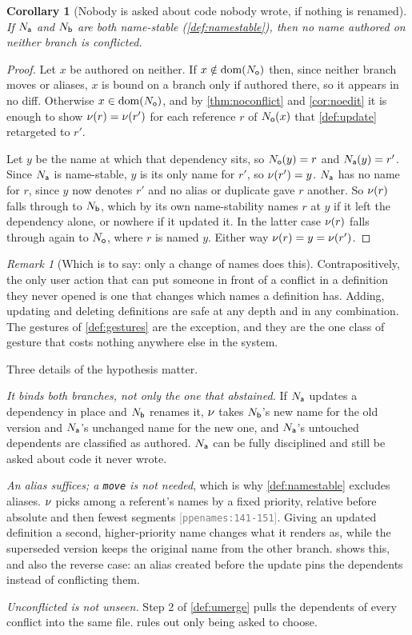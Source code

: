 \documentclass[11pt]{article}
\theoremstyle{definition}
\theoremstyle{plain}
\newtheorem{corollary}{Corollary}[section]
\theoremstyle{remark}
\newtheorem{remark}{Remark}[section]
\newcommand{\src}[1]{{\footnotesize\textcolor{gray}{[\texttt{#1}]}}}
\begin{document}
\begin{corollary}[Nobody is asked about code nobody wrote, if nothing is renamed]\label{cor:noedit-user}
If $N_{\mathsf{a}}$ and $N_{\mathsf{b}}$ are both name-stable (\cref{def:namestable}), then no name authored on neither
branch is conflicted.
\end{corollary}
\begin{proof}
Let $x$ be authored on neither. If $x \notin \operatorname{dom}(N_{\mathsf{o}})$ then, since neither branch moves or aliases,
$x$ is bound on a branch only if authored there, so it appears in no diff. Otherwise $x \in \operatorname{dom}(N_{\mathsf{o}})$,
and by \cref{thm:noconflict} and \cref{cor:noedit} it is enough to show $\nu(r) = \nu(r')$ for
each reference $r$ of $N_{\mathsf{o}}(x)$ that \cref{def:update} retargeted to $r'$.

Let $y$ be the name at which that dependency sits, so $N_{\mathsf{o}}(y) = r$ and $N_{\mathsf{a}}(y) = r'$. Since $N_{\mathsf{a}}$ is
name-stable, $y$ is its only name for $r'$, so $\nu(r') = y$. $N_{\mathsf{a}}$ has no name for $r$, since $y$
now denotes $r'$ and no alias or duplicate gave $r$ another. So $\nu(r)$ falls through to $N_{\mathsf{b}}$,
which by its own name-stability names $r$ at $y$ if it left the dependency alone, or nowhere if it
updated it. In the latter case $\nu(r)$ falls through again to $N_{\mathsf{o}}$, where $r$ is named $y$.
Either way $\nu(r) = y = \nu(r')$.
\end{proof}

\begin{remark}[Which is to say: only a change of names does this]\label{rem:onlyrenames}
Contrapositively, the only user action that can put someone in front of a conflict in a definition
they never opened is one that changes which names a definition has. Adding, updating and deleting
definitions are safe at any depth and in any combination. The gestures of \cref{def:gestures} are the
exception, and they are the one class of gesture that costs nothing anywhere else in the system.

Three details of the hypothesis matter.

\emph{It binds both branches, not only the one that abstained.} If $N_{\mathsf{a}}$ updates a dependency in place
and $N_{\mathsf{b}}$ renames it, $\nu$ takes $N_{\mathsf{b}}$'s new name for the old version and $N_{\mathsf{a}}$'s unchanged name
for the new one, and $N_{\mathsf{a}}$'s untouched dependents are classified as authored. $N_{\mathsf{a}}$ can be fully
disciplined and still be asked about code it never wrote.

\emph{An alias suffices; a \texttt{move} is not needed}, which is why \cref{def:namestable} excludes
aliases. $\nu$ picks among a referent's names by a fixed priority, relative before absolute and
then fewest segments \src{ppenames:141-151}. Giving an updated definition a second, higher-priority
name changes what it renders as, while the superseded version keeps the original name from the other
branch.  shows this, and also the reverse case: an alias created before the
update pins the dependents instead of conflicting them.

\emph{Unconflicted is not unseen.} Step 2 of \cref{def:umerge} pulls the dependents of every conflict
into the same file.  rules out only being asked to choose.
\end{remark}
\end{document}
